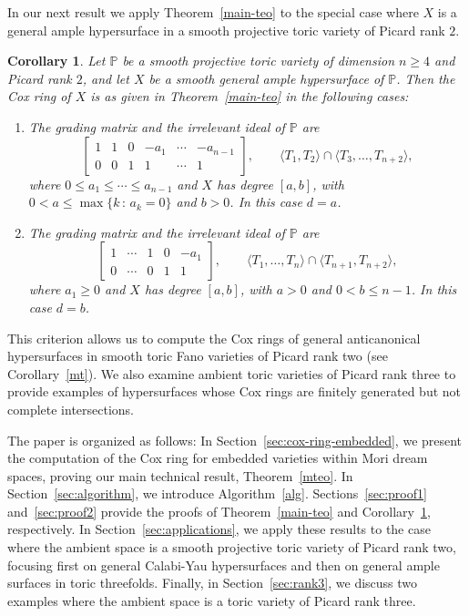 \documentclass{amsart}
\newtheorem{introcor}[introthm]{Corollary}
\theoremstyle{definition}
\theoremstyle{remark}
\begin{document}
In our next result we apply Theorem~\ref{main-teo} to the special case where $X$ is a general ample hypersurface in a smooth projective toric variety of Picard rank $2$.

\begin{introcor}
\label{main-cor}
Let $\mathbb{P}$ be a smooth projective
toric variety of dimension $n\geq 4$
and Picard rank $2$, and let $X$
be a smooth general ample hypersurface
of $\mathbb P$.
Then the Cox ring of $X$ is as given in Theorem~\ref{main-teo} in the following cases:
\begin{enumerate}
\item
The grading matrix and the irrelevant ideal of $\mathbb{P}$ are
\[
 \begin{bmatrix}
  1 & 1 & 0 & -a_1 & \cdots & -a_{n-1}\\
  0 & 0 & 1 & 1 & \cdots & 1
 \end{bmatrix},
 \qquad
 \langle T_1,T_2\rangle\cap \langle T_3,\dots,T_{n+2}\rangle,
\]
where $0\leq a_1\leq\cdots\leq a_{n-1}$
and $X$ has degree $[a,b]$, with $0< a\leq \max\{k\, :\, a_k=0\}$ and $b > 0$.
In this case $d = a$.
\item
The grading matrix and the irrelevant ideal of $\mathbb{P}$ are
\[
 \begin{bmatrix}
  1 & \cdots & 1 & 0 & -a_1\\
  0 & \cdots & 0 & 1 & 1
 \end{bmatrix},
 \qquad
 \langle T_1,\dots,T_n\rangle\cap \langle T_{n+1},T_{n+2}\rangle,
\]
where $a_1\geq 0$
and $X$ has degree $[a,b]$, with $a>0$ and $0<b\leq n-1$. In this case $d = b$.
\end{enumerate}
\end{introcor}

This criterion allows us to compute the Cox rings of general anticanonical hypersurfaces in smooth toric Fano varieties of Picard rank two (see Corollary~\ref{mt}). We also examine ambient toric varieties of Picard rank three to provide examples of hypersurfaces whose Cox rings are finitely generated but not complete intersections.

The paper is organized as follows: In Section~\ref{sec:cox-ring-embedded}, we present the computation of the Cox ring for embedded varieties within Mori dream spaces, proving our main technical result, Theorem~\ref{mteo}. In Section~\ref{sec:algorithm}, we introduce Algorithm~\ref{alg}. Sections~\ref{sec:proof1} and~\ref{sec:proof2} provide the proofs of Theorem~\ref{main-teo} and Corollary~\ref{main-cor}, respectively. In Section~\ref{sec:applications}, we apply these results to the case where the ambient space is a smooth projective toric variety of Picard rank two, focusing first on general Calabi-Yau hypersurfaces and then on general ample surfaces in toric threefolds. Finally, in Section~\ref{sec:rank3}, we discuss two examples where the ambient space is a toric variety of Picard rank three.
\end{document}
